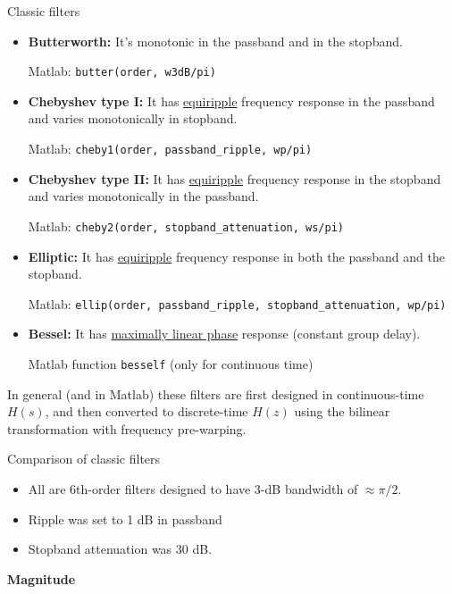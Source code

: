 \documentclass[10pt]{beamer}
\begin{document}
\begin{frame}{Classic filters}
	\begin{itemize}
		\item \textbf{Butterworth:}
		It's monotonic in the passband and in the stopband.
		
		Matlab: \texttt{butter(order, w3dB/pi)}
		\item \textbf{Chebyshev type I:}
		It has \underline{equiripple} frequency response in the passband and varies monotonically in stopband.
		
		Matlab: \texttt{cheby1(order, passband\_ripple, wp/pi)}
		\item \textbf{Chebyshev type II:}
		It has \underline{equiripple} frequency response in the stopband and varies monotonically in the passband.
		
		Matlab: \texttt{cheby2(order, stopband\_attenuation, ws/pi)}
		\item \textbf{Elliptic:}
		It has \underline{equiripple} frequency response in both the passband and the stopband.
		
		Matlab: \texttt{ellip(order, passband\_ripple, stopband\_attenuation, wp/pi)}
		
		\item \textbf{Bessel:}
		It has \underline{maximally linear phase} response (constant group delay).
		
		Matlab function \texttt{besself} (only for continuous time)
	\end{itemize}

	In general (and in Matlab) these filters are first designed in continuous-time $H(s)$, and then converted to discrete-time $H(z)$ using the bilinear transformation with frequency pre-warping.
\end{frame}

%
\begin{frame}{Comparison of classic filters}
\begin{itemize}
	\item All are 6th-order filters designed to have 3-dB bandwidth of $\approx \pi/2$.
	\item Ripple was set to 1 dB in passband
	\item Stopband attenuation was 30 dB.
\end{itemize}

\textbf{Magnitude}
\begin{center}
	\resizebox{0.75\linewidth}{!}{}
\end{center}

\end{frame}
\end{document}

